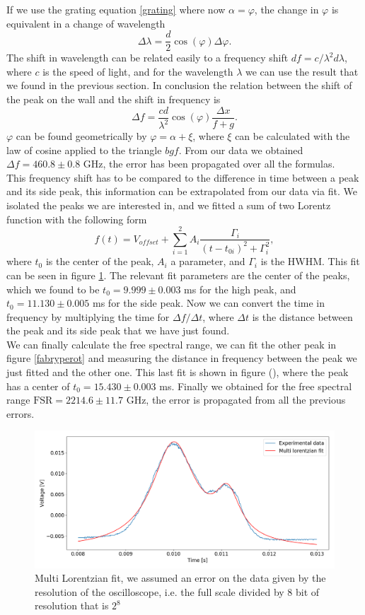 \documentclass[a4paper,10pt]{article}
\begin{document}
If we use the grating equation \eqref{grating} where now $\alpha = \varphi$, the change in $\varphi$ is equivalent in a change of wavelength
\[\Delta \lambda = \frac{d}{2}\cos(\varphi)\Delta \varphi.\]
The shift in wavelength can be related easily to a frequency shift $df = c/\lambda^2 d\lambda$, where $c$ is the speed of light, and for the wavelength $\lambda$ we can use the result that we found in the previous section. In conclusion the relation between the shift of the peak on the wall and the shift in frequency is
\[\Delta f = \frac{cd}{\lambda^2} \cos(\varphi)\frac{\Delta x}{f+g}.\]
$\varphi$ can be found geometrically by $\varphi = \alpha + \xi$, where $\xi$ can be calculated with the law of cosine applied to the triangle $bgf$. From our data we obtained $\Delta f = 460.8 \pm 0.8$ GHz, the error has been propagated over all the formulas.\\
This frequency shift has to be compared to the difference in time between a peak and its side peak, this information can be extrapolated from our data via fit. We isolated the peaks we are interested in, and we fitted a sum of two Lorentz function with the following form
\[f(t) = V_{offset}+\sum_{i=1}^2 A_i \frac{\Gamma_i}{(t-t_{0i})^2 + \Gamma_i^2},\]
where $t_0$ is the center of the peak, $A_i$ a parameter, and $\Gamma_i$ is the HWHM. This fit can be seen in figure \ref{fit}. The relevant fit parameters are the center of the peaks, which we found to be $t_{0} = 9.999 \pm 0.003$ ms for the high peak, and $t_0 = 11.130\pm  0.005$ ms for the side peak. Now we can convert the time in frequency by multiplying the time for $\Delta f/\Delta t$, where $\Delta t$ is the distance between the peak and its side peak that we have just found.\\
We can finally calculate the free spectral range, we can fit the other peak in figure \ref{fabryperot} and measuring the distance in frequency between the peak we just fitted and the other one. This last fit is shown in figure (), where the peak has a center of $t_0 = 15.430\pm 0.003$ ms. Finally we obtained for the free spectral range $\text{FSR}  = 2214.6\pm 11.7$ GHz, the error is propagated from all the previous errors.

\begin{figure}[H]
\centering
\includegraphics[width=\textwidth]{fit.png}
\caption{Multi Lorentzian fit, we assumed an error on the data given by the resolution of the oscilloscope, i.e. the full scale divided by 8 bit of resolution that is $2^8$}\label{fit}
\end{figure}
\end{document}
